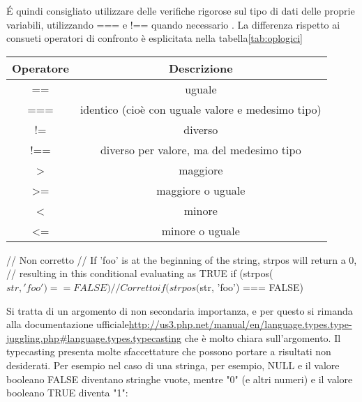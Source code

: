 \'E quindi consigliato utilizzare delle verifiche rigorose sul tipo di dati delle proprie variabili, utilizzando === e !== quando necessario . La differenza rispetto ai consueti operatori di confronto è esplicitata nella tabella\vref{tab:oplogici}

\label{tab:oplogici}
\begin{tabular}{cc}
\hline Operatore  & Descrizione \\ 
\hline ==  & uguale  \\ 
\hline === & identico (cioè con uguale valore e medesimo tipo) \\ 
\hline != & diverso  \\ 
\hline !== &  diverso per valore, ma del medesimo tipo \\ 
\hline > & maggiore \\ 
\hline >= & maggiore o uguale  \\ 
\hline < & minore \\ 
\hline <= & minore o uguale \\ 
\hline 
\end{tabular} 

\begin{code}
// Non corretto
// If 'foo' is at the beginning of the string, strpos will return a 0,
// resulting in this conditional evaluating as TRUE
if (strpos($str, 'foo') == FALSE)

// Corretto
if (strpos($str, 'foo') === FALSE)
\end{code}


Si tratta di un argomento di non secondaria importanza, e per questo si rimanda alla documentazione ufficiale\url{http://us3.php.net/manual/en/language.types.type-juggling.php#language.types.typecasting} che è molto chiara sull'argomento.
Il typecasting presenta molte sfaccettature che possono portare a risultati non desiderati. Per esempio nel caso di una stringa, per esempio, NULL e il valore booleano FALSE diventano stringhe vuote, mentre "0" (e altri numeri) e il valore booleano TRUE diventa "1":


